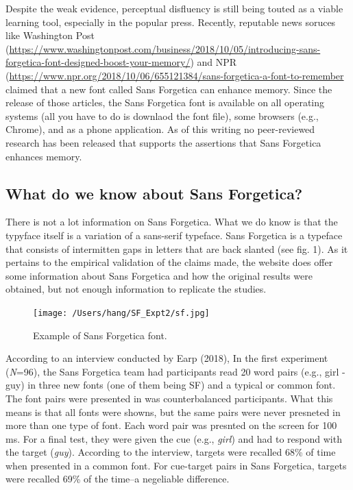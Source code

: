 \documentclass[english,doc]{apa6}
\begin{document}
Despite the weak evidence, perceptual disfluency is still being touted as a viable learning tool, especially in the popular press. Recently, reputable news soruces like Washington Post (\url{https://www.washingtonpost.com/business/2018/10/05/introducing-sans-forgetica-font-designed-boost-your-memory/}) and NPR (\url{https://www.npr.org/2018/10/06/655121384/sans-forgetica-a-font-to-remember} claimed that a new font called Sans Forgetica can enhance memory. Since the release of those articles, the Sans Forgetica font is available on all operating systems (all you have to do is downlaod the font file), some browsers (e.g., Chrome), and as a phone application. As of this writing no peer-reviewed research has been released that supports the assertions that Sans Forgetica enhances memory.

\hypertarget{what-do-we-know-about-sans-forgetica}{%
\subsection{What do we know about Sans Forgetica?}\label{what-do-we-know-about-sans-forgetica}}

There is not a lot information on Sans Forgetica. What we do know is that the typyface itself is a variation of a sans-serif typeface. Sans Forgetica is a typeface that consists of intermitten gaps in letters that are back slanted (see fig. 1). As it pertains to the empirical validation of the claims made, the website does offer some information about Sans Forgetica and how the original results were obtained, but not enough information to replicate the studies.

\begin{figure}
\centering
\texttt{[image: /Users/hang/SF\_Expt2/sf.jpg]}
\caption{\label{fig:unnamed-chunk-1}Example of Sans Forgetica font.}
\end{figure}

According to an interview conducted by Earp (2018), In the first experiment (\emph{N}=96), the Sans Forgetica team had participants read 20 word pairs (e.g., girl - guy) in three new fonts (one of them being SF) and a typical or common font. The font pairs were presented in was counterbalanced participants. What this means is that all fonts were showns, but the same pairs were never presneted in more than one type of font. Each word pair was presnted on the screen for 100 ms. For a final test, they were given the cue (e.g., \emph{girl}) and had to respond with the target (\emph{guy}). According to the interview, targets were recalled 68\% of time when presented in a common font. For cue-target pairs in Sans Forgetica, targets were recalled 69\% of the time--a negeliable difference.
\end{document}
